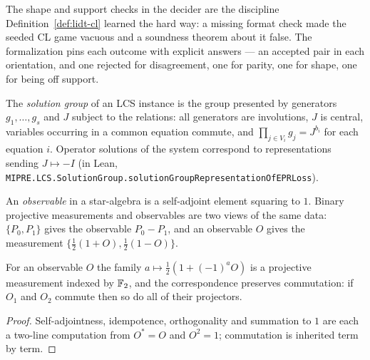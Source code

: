 The shape and support checks in the decider are the discipline
Definition~\ref{def:lidt-cl} learned the hard way: a missing format check made the seeded CL
game vacuous and a soundness theorem about it false. The formalization pins each outcome with
explicit answers --- an accepted pair in each orientation, and one rejected for disagreement,
one for parity, one for shape, one for being off support.

\begin{definition}
\label{def:solution-group}
\leanok
The \emph{solution group} of an LCS instance is the group presented by generators
$g_1, \dots, g_s$ and $J$ subject to the relations: all generators are involutions,
$J$ is central, variables occurring in a common equation commute, and
$\prod_{j \in V_i} g_j = J^{b_i}$ for each equation $i$. Operator solutions of the
system correspond to representations sending $J \mapsto -I$ (in Lean,
\texttt{MIPRE.LCS.SolutionGroup.solutionGroupRepresentationOfEPRLoss}).
\end{definition}

\begin{definition}
\label{def:observable}
\leanok
An \emph{observable} in a star-algebra is a self-adjoint element squaring to $1$. Binary
projective measurements and observables are two views of the same data: $\{P_0, P_1\}$
gives the observable $P_0 - P_1$, and an observable $O$ gives the measurement
$\{\tfrac12(1 + O), \tfrac12(1 - O)\}$.
\end{definition}

\begin{lemma}
\label{lem:observable-projector}
\leanok
For an observable $O$ the family $a \mapsto \tfrac12(1 + (-1)^a O)$ is a projective
measurement indexed by $\mathbb{F}_2$, and the correspondence preserves commutation: if $O_1$ and
$O_2$ commute then so do all of their projectors.
\end{lemma}

\begin{proof}
\leanok
Self-adjointness, idempotence, orthogonality and summation to $1$ are each a two-line
computation from $O^* = O$ and $O^2 = 1$; commutation is inherited term by term.
\end{proof}

